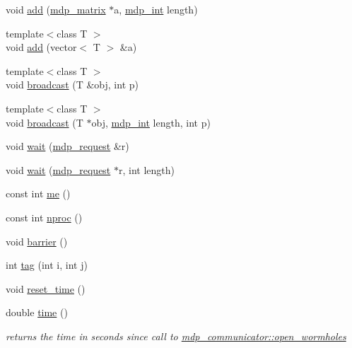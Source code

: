 \begin{DoxyCompactItemize}
void \hyperlink{classmdp__communicator_a03e473c3c953f458504fb21872a2a244}{add} (\hyperlink{classmdp__matrix}{mdp\_\-matrix} $\ast$a, \hyperlink{mdp__global__vars_8h_aaa1ad9d0dcd2124aa5af0120d9954174}{mdp\_\-int} length)
\item 
{\footnotesize template$<$class T $>$ }\\void \hyperlink{classmdp__communicator_ab3a9834d788e57d08c705453088a44f5}{add} (vector$<$ T $>$ \&a)
\item 
{\footnotesize template$<$class T $>$ }\\void \hyperlink{classmdp__communicator_a33af6d05c5f44bc69b5af721ed26c70e}{broadcast} (T \&obj, int p)
\item 
{\footnotesize template$<$class T $>$ }\\void \hyperlink{classmdp__communicator_ac735496a3b58e01cc8a7b5b76591f5c2}{broadcast} (T $\ast$obj, \hyperlink{mdp__global__vars_8h_aaa1ad9d0dcd2124aa5af0120d9954174}{mdp\_\-int} length, int p)
\item 
void \hyperlink{classmdp__communicator_ae63ed716fd7a459031dc2fc76da7c258}{wait} (\hyperlink{mdp__communicator_8h_ad8cbf5bc85a849902c39cd29d3f9a8f1}{mdp\_\-request} \&r)
\item 
void \hyperlink{classmdp__communicator_aca879bd68c152a2831d37455c7bffcc9}{wait} (\hyperlink{mdp__communicator_8h_ad8cbf5bc85a849902c39cd29d3f9a8f1}{mdp\_\-request} $\ast$r, int length)
\item 
const int \hyperlink{classmdp__communicator_ab4a002ef4c8bddc3133be4a1f9c6c3f8}{me} ()
\item 
const int \hyperlink{classmdp__communicator_af257b72bd642da879cb019b8cc6ebc6d}{nproc} ()
\item 
void \hyperlink{classmdp__communicator_a46a0990eb357e60a6768c706a2aaf272}{barrier} ()
\item 
int \hyperlink{classmdp__communicator_a927db59c7ab066becc693d3b944d7dfa}{tag} (int i, int j)
\item 
void \hyperlink{classmdp__communicator_a46086387c07ac505f7658718b52c073e}{reset\_\-time} ()
\item 
double \hyperlink{classmdp__communicator_a7e725836b00c3485cd02b3ad001cf6dd}{time} ()
\begin{DoxyCompactList}\small\item\em returns the time in seconds since call to \hyperlink{classmdp__communicator_af2c43869a689b8f1d020d4c4995b0cee}{mdp\_\-communicator::open\_\-wormholes} \item\end{DoxyCompactList}\item 

\end{DoxyCompactItemize}
